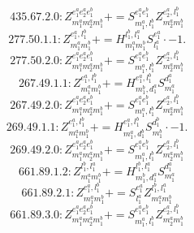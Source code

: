 \documentclass[letterpaper,10pt,fleqn,leqno,onecolumn]{article}
\begin{document}
\begin{equation} \;\;\;\;\;\;  435.67.2.0: Z^{e_{1}^{a}e_{2}^{a}e_{1}^{b}}_{m_{1}^{a}m_{2}^{a}m_{1}^{b}}+=S^{e_{1}^{a}e_{1}^{b}}_{m_{1}^{a},l_{1}^{b}}Z^{e_{2}^{a},l_{1}^{b}}_{m_{2}^{a}m_{1}^{b}} \end{equation}
\begin{equation} \;\;\;\;\;\;  277.50.1.1: Z^{e_{1}^{a},l_{1}^{b}}_{m_{1}^{a}m_{1}^{b}}+=H^{l_{1}^{b},l_{1}^{a}}_{m_{1}^{a}m_{1}^{b}}S^{e_{1}^{a}}_{l_{1}^{a}}\cdot -1. \end{equation}
\begin{equation} \;\;\;\;\;\;  277.50.2.0: Z^{e_{1}^{a}e_{2}^{a}e_{1}^{b}}_{m_{1}^{a}m_{2}^{a}m_{1}^{b}}+=S^{e_{1}^{a}e_{1}^{b}}_{m_{1}^{a},l_{1}^{b}}Z^{e_{2}^{a},l_{1}^{b}}_{m_{2}^{a}m_{1}^{b}} \end{equation}
\begin{equation} \;\;\;\;\;\;  267.49.1.1: Z^{e_{1}^{a},l_{1}^{b}}_{m_{1}^{a}m_{1}^{b}}+=H^{e_{1}^{a},l_{1}^{b}}_{m_{1}^{b},d_{1}^{a}}S^{d_{1}^{a}}_{m_{1}^{a}} \end{equation}
\begin{equation} \;\;\;\;\;\;  267.49.2.0: Z^{e_{1}^{a}e_{2}^{a}e_{1}^{b}}_{m_{1}^{a}m_{2}^{a}m_{1}^{b}}+=S^{e_{1}^{a}e_{1}^{b}}_{m_{1}^{a},l_{1}^{b}}Z^{e_{2}^{a},l_{1}^{b}}_{m_{2}^{a}m_{1}^{b}} \end{equation}
\begin{equation} \;\;\;\;\;\;  269.49.1.1: Z^{e_{1}^{a},l_{1}^{b}}_{m_{1}^{a}m_{1}^{b}}+=H^{e_{1}^{a},l_{1}^{b}}_{m_{1}^{a},d_{1}^{b}}S^{d_{1}^{b}}_{m_{1}^{b}}\cdot -1. \end{equation}
\begin{equation} \;\;\;\;\;\;  269.49.2.0: Z^{e_{1}^{a}e_{2}^{a}e_{1}^{b}}_{m_{1}^{a}m_{2}^{a}m_{1}^{b}}+=S^{e_{1}^{a}e_{1}^{b}}_{m_{1}^{a},l_{1}^{b}}Z^{e_{2}^{a},l_{1}^{b}}_{m_{2}^{a}m_{1}^{b}} \end{equation}
\begin{equation} \;\;\;\;\;\;  661.89.1.2: Z^{l_{1}^{b},l_{1}^{a}}_{m_{1}^{a}m_{1}^{b}}+=H^{l_{1}^{b},l_{1}^{a}}_{m_{1}^{b},d_{1}^{a}}S^{d_{1}^{a}}_{m_{1}^{a}} \end{equation}
\begin{equation} \;\;\;\;\;\;  661.89.2.1: Z^{e_{1}^{a},l_{1}^{b}}_{m_{1}^{a}m_{1}^{b}}+=S^{e_{1}^{a}}_{l_{1}^{a}}Z^{l_{1}^{b},l_{1}^{a}}_{m_{1}^{a}m_{1}^{b}} \end{equation}
\begin{equation} \;\;\;\;\;\;  661.89.3.0: Z^{e_{1}^{a}e_{2}^{a}e_{1}^{b}}_{m_{1}^{a}m_{2}^{a}m_{1}^{b}}+=S^{e_{1}^{a}e_{1}^{b}}_{m_{1}^{a},l_{1}^{b}}Z^{e_{2}^{a},l_{1}^{b}}_{m_{2}^{a}m_{1}^{b}} \end{equation}
\end{document}
